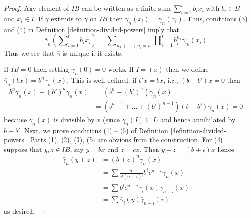 \begin{proof}
Any element of $IB$ can be written as a finite sum $\sum\nolimits_{i=1}^t b_ix_i$ with
$b_i \in B$ and $x_i \in I$. If $\gamma$ extends to $\bar\gamma$ on $IB$
then $\bar\gamma_n(x_i) = \gamma_n(x_i)$.
Thus, conditions (3) and (4) in Definition \ref{definition-divided-powers} imply that
$$
\bar\gamma_n(\sum\nolimits_{i=1}^t b_ix_i) =
\sum\nolimits_{n_1 + \ldots + n_t = n}
\prod\nolimits_{i = 1}^t b_i^{n_i}\gamma_{n_i}(x_i)
$$
Thus we see that $\bar\gamma$ is unique if it exists.

\medskip\noindent
If $IB = 0$ then setting $\bar\gamma_n(0) = 0$ works. If $I = (x)$
then we define $\bar\gamma_n(bx) = b^n\gamma_n(x)$. This is well defined:
if $b'x = bx$, i.e., $(b - b')x = 0$ then
\begin{align*}
b^n\gamma_n(x) - (b')^n\gamma_n(x)
& =
(b^n - (b')^n)\gamma_n(x) \\
& =
(b^{n - 1} + \ldots + (b')^{n - 1})(b - b')\gamma_n(x) = 0
\end{align*}
because $\gamma_n(x)$ is divisible by $x$ (since
$\gamma_n(I) \subseteq I$) and hence annihilated by $b - b'$.
Next, we prove conditions (1) -- (5) of
Definition \ref{definition-divided-powers}.
Parts (1), (2), (3), (5) are obvious from the construction.
For (4) suppose that $y, z \in IB$, say $y = bx$ and $z = cx$. Then
$y + z = (b + c)x$ hence
\begin{align*}
\bar\gamma_n(y + z)
& =
(b + c)^n\gamma_n(x) \\
& =
\sum \frac{n!}{i!(n - i)!}b^ic^{n -i}\gamma_n(x) \\
& =
\sum b^ic^{n - i}\gamma_i(x)\gamma_{n - i}(x) \\
& =
\sum \bar\gamma_i(y)\bar\gamma_{n -i}(z)
\end{align*}
as desired.


\end{proof}
